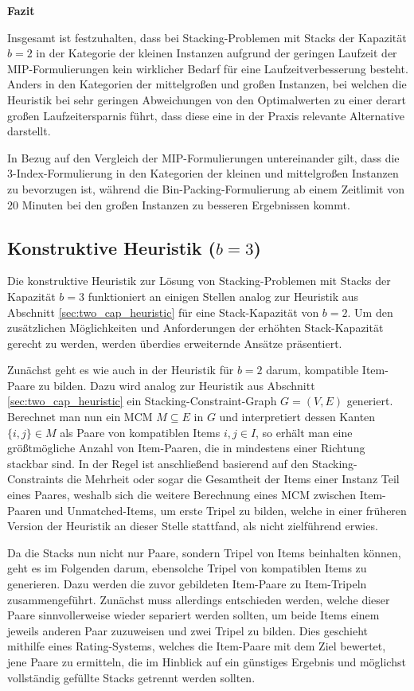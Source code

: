 \textbf{Fazit}

Insgesamt ist festzuhalten, dass bei Stacking-Problemen mit Stacks der Kapazität $b = 2$ in der Kategorie der kleinen Instanzen aufgrund der geringen Laufzeit der MIP-Formulierungen kein wirklicher Bedarf für eine Laufzeitverbesserung besteht. Anders in den Kategorien der mittelgroßen und großen Instanzen, bei welchen die Heuristik bei sehr geringen Abweichungen von den Optimalwerten zu einer derart großen Laufzeitersparnis führt, dass diese eine in der Praxis relevante Alternative darstellt.

In Bezug auf den Vergleich der MIP-Formulierungen untereinander gilt, dass die 3-Index-Formulierung in den Kategorien
der kleinen und mittelgroßen Instanzen zu bevorzugen ist, während die Bin-Packing-Formulierung ab einem Zeitlimit
von $20$ Minuten bei den großen Instanzen zu besseren Ergebnissen kommt.

\subsection{Konstruktive Heuristik ($b = 3$)}
\label{sec:three_cap_heuristic}

Die konstruktive Heuristik zur Lösung von Stacking-Problemen mit Stacks der Kapazität $b = 3$ funktioniert
an einigen Stellen analog zur Heuristik aus Abschnitt \ref{sec:two_cap_heuristic} für eine Stack-Kapazität von $b = 2$.
Um den zusätzlichen Möglichkeiten und Anforderungen der erhöhten Stack-Kapazität gerecht zu werden, werden überdies
erweiternde Ansätze präsentiert.

Zunächst geht es wie auch in der Heuristik für $b = 2$ darum, kompatible Item-Paare zu bilden.
Dazu wird analog zur Heuristik aus Abschnitt \ref{sec:two_cap_heuristic} ein Stacking-Constraint-Graph $G = (V, E)$ generiert.
Berechnet man nun ein \textsc{MCM} $M \subseteq E$ in $G$ und interpretiert dessen Kanten $\{i, j\} \in M$ als Paare von kompatiblen Items
$i, j \in I$, so erhält man eine größtmögliche Anzahl von Item-Paaren, die in mindestens einer Richtung stackbar sind.
In der Regel ist anschließend basierend auf den Stacking-Constraints die Mehrheit oder sogar die Gesamtheit der Items einer Instanz Teil eines Paares, weshalb sich die weitere Berechnung eines \textsc{MCM} zwischen Item-Paaren und Unmatched-Items,
um erste Tripel zu bilden, welche in einer früheren Version der Heuristik an dieser Stelle stattfand, als nicht zielführend
erwies.

Da die Stacks nun nicht nur Paare, sondern Tripel von Items beinhalten können, geht es im Folgenden darum,
ebensolche Tripel von kompatiblen Items zu generieren. Dazu werden die zuvor gebildeten Item-Paare zu Item-Tripeln zusammengeführt.
Zunächst muss allerdings entschieden werden, welche dieser Paare sinnvollerweise wieder separiert werden sollten,
um beide Items einem jeweils anderen Paar zuzuweisen und zwei Tripel zu bilden. Dies geschieht mithilfe eines Rating-Systems, welches die Item-Paare mit dem Ziel bewertet, jene Paare zu ermitteln, die im Hinblick auf ein günstiges Ergebnis
und möglichst vollständig gefüllte Stacks getrennt werden sollten.

